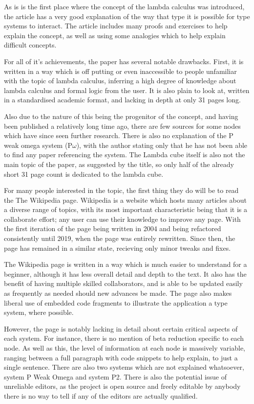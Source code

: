 \documentclass{l4proj}
\begin{document}
As is is the first place where the concept of the lambda calculus was introduced, the article has a very good explanation of the way that type it is possible for type systems to interact.  The article includes many proofs and exercises to help explain the concept, as well as using some analogies which to help explain difficult concepts.

For all of it's achievements, the paper has several notable drawbacks.  First, it is written in a way which is off putting or even inaccessible to people unfamiliar with the topic of lambda calculus, inferring a high degree of knowledge about lambda calculus and formal logic from the user.  It is also plain to look at, written in a standardised academic format, and lacking in depth at only 31 pages long.

Also due to the nature of this being the progenitor of the concept, and having been published a relatively long time ago, there are few sources for some nodes which have since seen further research.  There is also no explanation of the P weak omega system (P\underline{$\omega$}), with the author stating only that he has not been able to find any paper referencing the system.  The Lambda cube itself is also not the main topic of the paper, as suggested by the title, so only half of the already short 31 page count is dedicated to the lambda cube.

For many people interested in the topic, the first thing they do will be to read the The Wikipedia page.  Wikipedia is a website which hosts many articles about a diverse range of topics, with its most important characteristic being that it is a collaborate effort; any user can use their knowledge to improve any page.  With the first iteration of the page being written in 2004 and being refactored consistently until 2019, when the page was entirely rewritten.  Since then, the page has remained in a similar state, recieving only minor tweaks and fixes.

The Wikipedia page is written in a way which is much easier to understand for a beginner, although it has less overall detail and depth to the text.  It also has the benefit of having multiple skilled collaborators, and is able to be updated easily as frequently as needed should new advances be made.  The page also makes liberal use of embedded code fragments to illustrate the application a type system, where possible.

However, the page is notably lacking in detail about certain critical aspects of each system.  For instance, there is no mention of beta reduction specific to each node.  As well as this, the level of information at each node is massively variable, ranging between a full paragraph with code snippets to help explain, to just a single sentence.  There are also two systems which are not explained whatsoever, system P Weak Omega and system P2.  There is also the potential issue of unreliable editors, as the project is open source and freely editable by anybody there is no way to tell if any of the editors are actually qualified.
\end{document}
